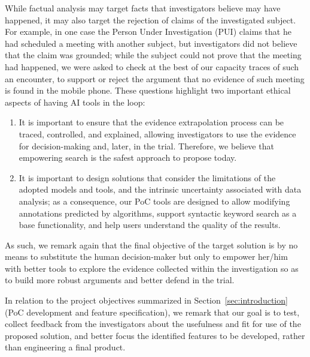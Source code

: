 
While factual analysis may target facts that investigators believe may have happened, it may also target the rejection of claims of the investigated subject. For example, in one case the Person Under Investigation (PUI) claims that he had scheduled a meeting with another subject, but investigators did not believe that the claim was grounded; while the subject could not prove that the meeting had happened, we were asked to check at the best of our capacity traces of such an encounter, to support or reject the argument that no evidence of such meeting is found in the mobile phone. These questions highlight two important ethical aspects of having AI tools in the loop:
\begin{enumerate}
    \item It is important to ensure that the evidence extrapolation process can be traced, controlled, and explained, allowing investigators to use the evidence for decision-making and, later, in the trial. Therefore, we believe that empowering search is the safest approach to propose today.  
    \item It is important to design solutions that consider the limitations of the adopted models and tools, and the intrinsic uncertainty associated with data analysis; as a consequence, our PoC tools are designed to allow modifying annotations predicted by algorithms, support syntactic keyword search as a base functionality, and help users understand the quality of the results.   
\end{enumerate}

As such, we remark again that the final objective of the target solution is by no means to substitute the human decision-maker but only to empower her/him with better tools to explore the evidence collected within the investigation so as to build more robust arguments and better defend in the trial.

In relation to the project objectives summarized in Section~\ref{sec:introduction} (PoC development and feature specification), we remark that our goal is to test,     
collect feedback from the investigators about the usefulness and fit for use of the proposed solution, and better focus the identified features to be developed, rather than engineering a final product. 


